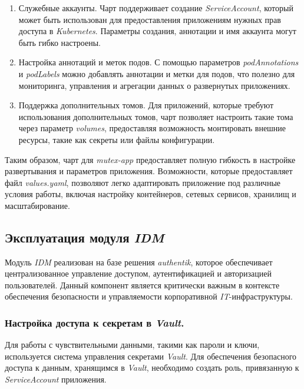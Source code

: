 \begin{enumerate}
    \item Служебные аккаунты. Чарт поддерживает создание \textit{ServiceAccount}, который может быть использован для предоставления приложениям нужных прав доступа в \textit{Kubernetes}. Параметры создания, аннотации и имя аккаунта могут быть гибко настроены.

    \item Настройка аннотаций и меток подов. С помощью параметров \textit{podAnnotations} и \textit{podLabels} можно добавлять аннотации и метки для подов, что полезно для мониторинга, управления и агрегации данных о развернутых приложениях.

    \item Поддержка дополнительных томов. Для приложений, которые требуют использования дополнительных томов, чарт позволяет настроить такие тома через параметр \textit{volumes}, предоставляя возможность монтировать внешние ресурсы, такие как секреты или файлы конфигурации.

\end{enumerate}

Таким образом, чарт для \textit{mutex-app} предоставляет полную гибкость в настройке развертывания и параметров приложения. Возможности, которые предоставляет файл \textit{values.yaml}, позволяют легко адаптировать приложение под различные условия работы, включая настройку контейнеров, сетевых сервисов, хранилищ и масштабирование.



\subsection{Эксплуатация модуля \textit{IDM}}

Модуль \textit{IDM} реализован на базе решения \textit{authentik}, которое обеспечивает централизованное управление доступом, аутентификацией и авторизацией пользователей. Данный компонент является критически важным в контексте обеспечения безопасности и управляемости корпоративной \textit{IT}-инфраструктуры.

\subsubsection{Настройка доступа к секретам в \textit{Vault}.} Для работы с чувствительными данными, такими как пароли и ключи, используется система управления секретами \textit{Vault}. Для обеспечения безопасного доступа к данным, хранящимся в \textit{Vault}, необходимо создать роль, привязанную к \textit{ServiceAccount} приложения.

